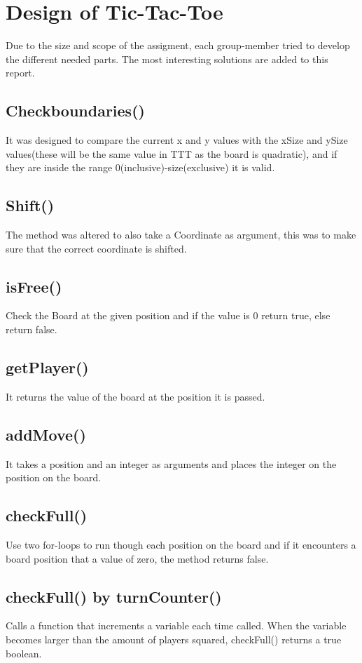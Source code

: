 \documentclass[a4paper,10pt]{article}
\begin{document}
	\section{Design of Tic-Tac-Toe}
	Due to the size and scope of the assigment, each group-member tried to develop the different needed parts. The most interesting solutions are added to this report.
	\subsection{Checkboundaries()}
	It was designed to compare the current x and y values with the xSize and ySize values(these will be the same value in TTT as the board is quadratic), and if they are inside the range 0(inclusive)-size(exclusive) it is valid.
	\subsection{Shift()}
	The method was altered to also take a Coordinate as argument, this was to make sure that the correct coordinate is shifted.
	\subsection{isFree()}
	Check the Board at the given position and if the value is 0 return true, else return false.
	\subsection{getPlayer()}
	It returns the value of the board at the position it is passed.
	\subsection{addMove()}
	It takes a position and an integer as arguments and places the integer on the position on the board.
	\subsection{checkFull()}
	Use two for-loops to run though each position on the board and if it encounters a board position that a value of zero, the method returns false.
	
	\subsection{checkFull() by turnCounter()}
	Calls a function that increments a variable each time called. When the variable becomes larger than the amount of players squared, checkFull() returns a true boolean.
	
\end{document}

